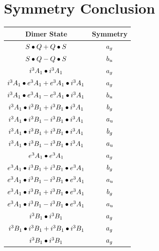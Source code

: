\documentclass{article}
\begin{document}
\vspace{0.5cm}

\newpage
\newpage

\section{Symmetry Conclusion} 
\begin{table}[H]
\centering
\begin{tabular}{cc}
\hline
Dimer State & Symmetry \\[0.1cm] 
\hline
$S \bullet Q + Q \bullet S \displaystyle $ & $a_{g} \displaystyle $ \\[0.1cm] 
$S \bullet Q - Q \bullet S \displaystyle $ & $b_u \displaystyle $ \\[0.1cm] 
$i^3 A_1 \bullet i^3 A_1 \displaystyle $ & $a_{g} \displaystyle $ \\[0.1cm] 
$i^3 A_1 \bullet e^3 A_1 + e^3 A_1 \bullet i^3 A_1 \displaystyle $ & $a_{g} \displaystyle $ \\[0.1cm] 
$i^3 A_1 \bullet e^3 A_1 - e^3 A_1 \bullet i^3 A_1 \displaystyle $ & $b_u \displaystyle $ \\[0.1cm] 
$i^3 A_1 \bullet i^3 B_{1} + i^3 B_{1} \bullet i^3 A_1 \displaystyle $ & $b_g \displaystyle $ \\[0.1cm] 
$i^3 A_1 \bullet i^3 B_{1} - i^3 B_{1} \bullet i^3 A_1 \displaystyle $ & $a_{u} \displaystyle $ \\[0.1cm] 
$i^3 A_1 \bullet i^3 B_{1} + i^3 B_{1} \bullet i^3 A_1 \displaystyle $ & $b_g \displaystyle $ \\[0.1cm] 
$i^3 A_1 \bullet i^3 B_{1} - i^3 B_{1} \bullet i^3 A_1 \displaystyle $ & $a_{u} \displaystyle $ \\[0.1cm] 
$e^3 A_1 \bullet e^3 A_1 \displaystyle $ & $a_{g} \displaystyle $ \\[0.1cm] 
$e^3 A_1 \bullet i^3 B_{1} + i^3 B_{1} \bullet e^3 A_1 \displaystyle $ & $b_g \displaystyle $ \\[0.1cm] 
$e^3 A_1 \bullet i^3 B_{1} - i^3 B_{1} \bullet e^3 A_1 \displaystyle $ & $a_{u} \displaystyle $ \\[0.1cm] 
$e^3 A_1 \bullet i^3 B_{1} + i^3 B_{1} \bullet e^3 A_1 \displaystyle $ & $b_g \displaystyle $ \\[0.1cm] 
$e^3 A_1 \bullet i^3 B_{1} - i^3 B_{1} \bullet e^3 A_1 \displaystyle $ & $a_{u} \displaystyle $ \\[0.1cm] 
$i^3 B_{1} \bullet i^3 B_{1} \displaystyle $ & $a_{g} \displaystyle $ \\[0.1cm] 
$i^3 B_{1} \bullet i^3 B_{1} + i^3 B_{1} \bullet i^3 B_{1} \displaystyle $ & $a_{g} \displaystyle $ \\[0.1cm] 
$i^3 B_{1} \bullet i^3 B_{1} \displaystyle $ & $a_{g} \displaystyle $ \\[0.1cm] 
\hline
\end{tabular}
\end{table}
\end{document}
